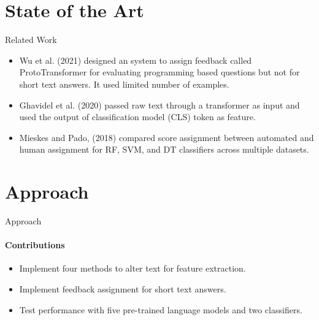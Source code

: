 \documentclass[aspectratio=169]{beamer}
\begin{document}
\section{State of the Art}
\begin{frame}{Related Work}
\begin{itemize}
	\item Wu et al. (2021) designed an system to assign feedback called ProtoTransformer for evaluating programming based questions but not for short text answers. It used limited number of examples.
	
	\item Ghavidel et al. (2020) passed raw text through a transformer as input and used the output of classification model (CLS) token as feature.
	
	\item Mieskes and Pado, (2018) compared score assignment between automated and human assignment for RF, SVM, and DT classifiers across multiple datasets.
\end{itemize}

\end{frame}
\section{Approach}

\begin{frame}{Approach}
\framesubtitle{Contributions}
\begin{itemize}
	\item Implement four methods to alter text for feature extraction.
	\item Implement feedback assignment for short text answers.
	\item Test performance with five pre-trained language models and two classifiers.
\end{itemize}
\end{frame}
\end{document}
